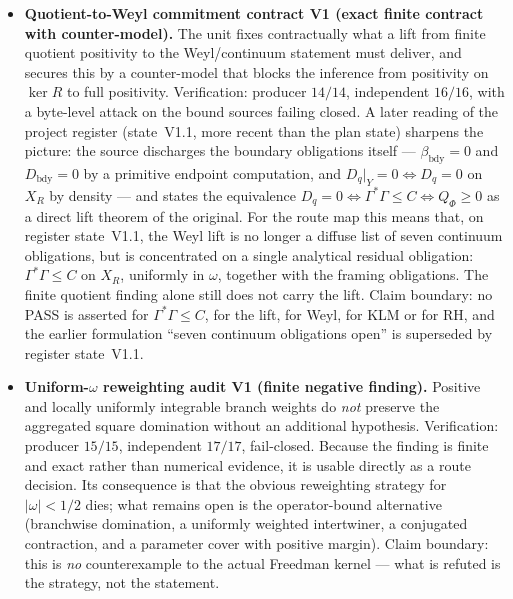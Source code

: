 \documentclass[12pt,a4paper]{article}
\theoremstyle{definition}
\theoremstyle{remark}
\begin{document}
\begin{itemize}
  \item \textbf{Quotient-to-Weyl commitment contract V1 (exact finite
    contract with counter-model).} The unit fixes contractually what a
    lift from finite quotient positivity to the Weyl/continuum statement
    must deliver, and secures this by a counter-model that blocks the
    inference from positivity on $\ker R$ to full positivity. Verification:
    producer $14/14$, independent $16/16$, with a byte-level attack on the
    bound sources failing closed. A later reading of the project register
    (state~V1.1, more recent than the plan state) sharpens the picture: the
    source discharges the boundary obligations itself ---
    $\beta_{\mathrm{bdy}} = 0$ and $D_{\mathrm{bdy}} = 0$ by a primitive
    endpoint computation, and $D_q|_Y = 0 \Longleftrightarrow D_q = 0$ on
    $X_R$ by density --- and states the equivalence
    $D_q = 0 \Longleftrightarrow \Gamma^*\Gamma \le C
    \Longleftrightarrow Q_\Phi \ge 0$ as a direct lift theorem of the
    original. For the route map this means that, on register state~V1.1,
    the Weyl lift is no longer a diffuse list of seven continuum
    obligations, but is concentrated on a
    single analytical residual obligation: $\Gamma^*\Gamma \le C$ on $X_R$,
    uniformly in $\omega$, together with the framing obligations. The
    finite quotient finding alone still does not carry the lift. Claim
    boundary: no PASS is asserted for $\Gamma^*\Gamma \le C$, for the lift,
    for Weyl, for KLM or for RH, and the earlier formulation ``seven
    continuum obligations open'' is superseded by register state~V1.1.

  \item \textbf{Uniform-$\omega$ reweighting audit V1 (finite negative
    finding).} Positive and locally uniformly integrable branch weights do
    \emph{not} preserve the aggregated square domination without an
    additional hypothesis. Verification: producer $15/15$, independent
    $17/17$, fail-closed. Because the finding is finite and exact rather
    than numerical evidence, it is usable directly as a route decision. Its
    consequence is that the obvious reweighting strategy for
    $|\omega| < 1/2$ dies; what remains open is the operator-bound
    alternative (branchwise domination, a uniformly weighted intertwiner, a
    conjugated contraction, and a parameter cover with positive margin).
    Claim boundary: this is \emph{no} counterexample to the actual Freedman
    kernel --- what is refuted is the strategy, not the statement.


\end{itemize}
\end{document}
